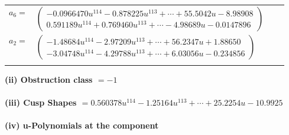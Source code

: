\documentclass[1p]{elsarticle_modified}
\theoremstyle{definition}
\begin{document}
\begin{tabular}{m{7pt} m{180pt} m{7pt} m{180pt} }
\flushright $a_{6}=$&$\begin{pmatrix}-0.0966470 u^{114}-0.878225 u^{113}+\cdots+55.5042 u-8.98908\\0.591189 u^{114}+0.769460 u^{113}+\cdots-4.98689 u-0.0147896\end{pmatrix}$ \\
\flushright $a_{2}=$&$\begin{pmatrix}-1.48684 u^{114}-2.97209 u^{113}+\cdots+56.2347 u+1.88650\\-3.04748 u^{114}-4.29788 u^{113}+\cdots+6.03056 u-0.234856\end{pmatrix}$\\&\end{tabular}
\flushleft \textbf{(ii) Obstruction class $= -1$}\\~\\
\flushleft \textbf{(iii) Cusp Shapes $= 0.560378 u^{114}-1.25164 u^{113}+\cdots+25.2254 u-10.9925$}\\~\\
\newpage\renewcommand{\arraystretch}{1}
\flushleft \textbf{(iv) u-Polynomials at the component}\newline \\
\end{document}
